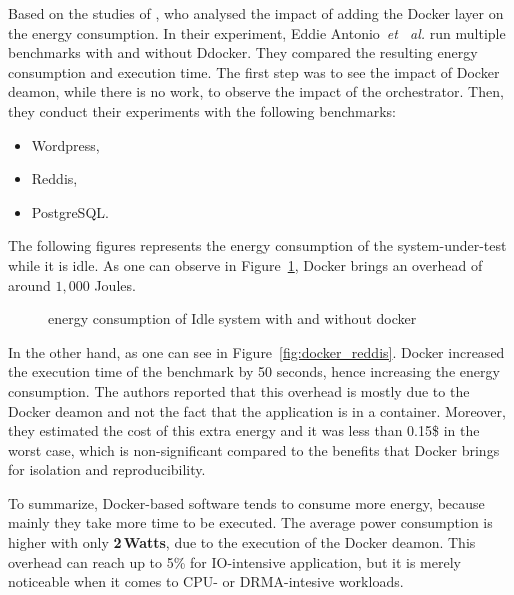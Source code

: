 Based on the studies of \cite{santos2018does}, who analysed the impact of adding the Docker layer on the energy consumption.
In their experiment, Eddie Antonio~\emph{et~ al.} run multiple benchmarks with and without Ddocker. 
They compared the resulting energy consumption and execution time.
The first step was to see the impact of Docker deamon, while there is no work, to observe the impact of the orchestrator.
Then, they conduct their experiments with the following benchmarks:
\begin{itemize}
    \item Wordpress,
    \item Reddis,
    \item PostgreSQL.
\end{itemize}

The following figures represents the energy consumption of the system-under-test while it is idle.
As one can observe in Figure~\ref{fig:docker_idle}, Docker brings an overhead of around $1,000$ Joules.

\begin{figure}
    \caption{energy consumption of Idle system with and without docker \cite{santos2018does}}\label{fig:docker_idle}
\end{figure}

In the other hand, as one can see in Figure~\ref{fig:docker_reddis}.
Docker increased the execution time of the benchmark by 50 seconds, hence increasing the energy consumption.
The authors reported that this overhead is mostly due to the Docker deamon and not the fact that the application is in a container.
Moreover, they estimated the cost of this extra energy and it was less than 0.15\$ in the worst case, which is non-significant compared to the benefits that Docker brings for isolation and reproducibility.

To summarize, Docker-based software tends to consume more energy, because mainly they take more time to be executed.
The average power consumption is higher with only \textbf{2\,Watts}, due to the execution of the Docker deamon.
This overhead can reach up to 5\% for IO-intensive application, but it is merely noticeable when it comes to CPU- or DRMA-intesive workloads.

